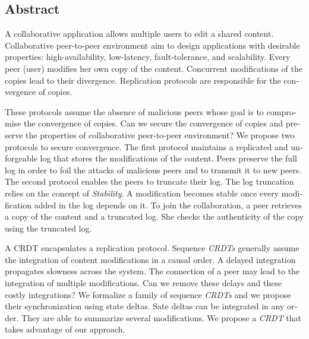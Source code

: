 \begin{ThesisAbstract}
\begin{otherlanguage}{english}
\subsection*{\centering Abstract}

A collaborative application allows multiple users to edit a shared content.
Collaborative peer-to-peer environment aim to design applications with desirable properties: high-availability, low-latency, fault-tolerance, and scalability.
Every peer (user) modifies her own copy of the content.
Concurrent modifications of the copies lead to their divergence.
Replication protocols are responsible for the convergence of copies.

These protocols assume the absence of malicious peers whose goal is to compromise the convergence of copies.
Can we secure the convergence of copies and preserve the properties of collaborative peer-to-peer environment?
We propose two protocols to secure convergence.
The first protocol maintains a replicated and unforgeable log that stores the modifications of the content.
Peers preserve the full log in order to foil the attacks of malicious peers and to transmit it to new peers.
The second protocol enables the peers to truncate their log.
The log truncation relies on the concept of \emph{Stability}.
A modification becomes stable once every modification added in the log depends on it.
To join the collaboration, a peer retrieves a copy of the content and a truncated log.
She checks the authenticity of the copy using the truncated log.

A \acf{CRDT} encapsulates a replication protocol.
Sequence \emph{CRDTs} generally assume the integration of content modifications in a causal order.
A delayed integration propagates slowness across the system.
The connection of a peer may lead to the integration of multiple modifications.
Can we remove these delays and these costly integrations?
We formalize a family of sequence \emph{CRDTs} and we propose their synchronization using state deltas.
Sate deltas can be integrated in any order.
They are able to summarize several modifications.
We propose a \emph{CRDT} that takes advantage of our approach.
\end{otherlanguage}
\end{ThesisAbstract}
